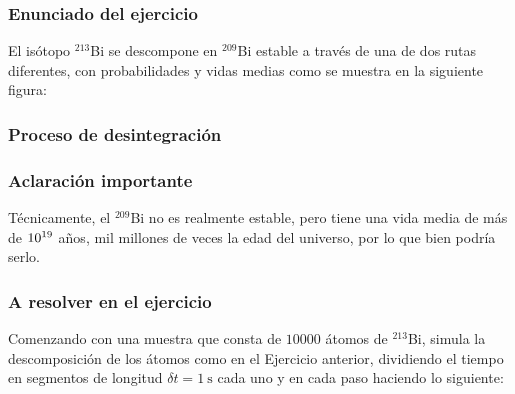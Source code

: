 \documentclass[12pt]{beamer}
\begin{document}
\begin{frame}
\frametitle{Enunciado del ejercicio}
El isótopo ${}^{213}$Bi se descompone en ${}^{209}$Bi estable a través de una de dos rutas diferentes, con probabilidades y vidas medias como se muestra en la siguiente figura:
\end{frame}
\begin{frame}
\frametitle{Proceso de desintegración}
\begin{figure}
    \centering
\end{figure}
\end{frame}
\begin{frame}
\frametitle{Aclaración importante}
Técnicamente, el ${}^{209}$Bi no es realmente estable, pero tiene una vida media de más de $\num{d19}$ años, mil millones de veces la edad del universo, por lo que bien podría serlo.
\end{frame}
\begin{frame}
\frametitle{A resolver en el ejercicio}
Comenzando con una muestra que consta de $10000$ átomos de ${}^{213}$Bi, simula la descomposición de los átomos como en el Ejercicio anterior, dividiendo el tiempo en segmentos de longitud $\delta t = \SI{1}{\second}$ cada uno y en cada paso haciendo lo siguiente:
\end{frame}
\end{document}
